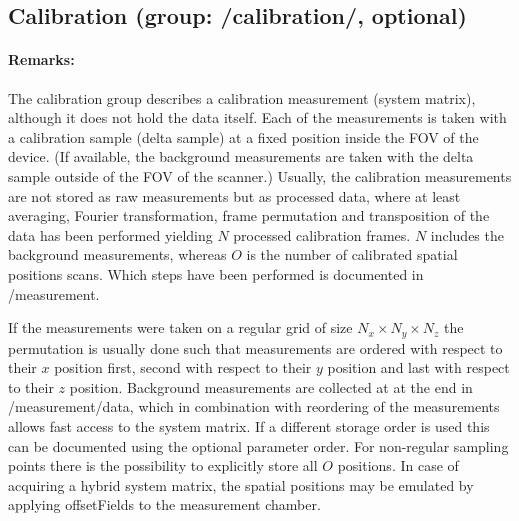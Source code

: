 \documentclass[landscape,a4paper]{article} %
\newcommand{\inlvar}[1]{{\ttfamily#1}}
\begin{document}
\subsection{Calibration (group: \inlvar{/calibration/}, optional)}

\begin{multicols}{2}
\paragraph{Remarks:}
The calibration group describes a calibration measurement (system matrix), although it does not hold the data itself. Each of the measurements is taken with a calibration sample (delta sample) at a fixed position inside the FOV of the device. (If available, the background measurements are taken with the delta sample outside of the FOV of the scanner.) Usually, the calibration measurements are not stored as raw measurements but as processed data, where at least averaging, Fourier transformation, frame permutation and transposition of the data has been performed yielding $N$ processed calibration frames. $N$ includes the background measurements, whereas $O$ is the number of calibrated spatial positions scans. Which steps have been performed is documented in \inlvar{/measurement}.

If the measurements were taken on a regular grid of size $N_x \times N_y \times N_z$ the permutation is usually done such that measurements are ordered with respect to their $x$ position first, second with respect to their $y$ position and last with respect to their $z$ position. Background measurements are collected at at the end in \inlvar{/measurement/data}, which in combination with reordering of the measurements allows fast access to the system matrix. If a different storage order is used this can be documented using the optional parameter \inlvar{order}. For non-regular sampling points there is the possibility to explicitly store all $O$ positions. In case of acquiring a hybrid system matrix, the spatial positions may be emulated by applying \inlvar{offsetFields} to the measurement chamber.
\end{multicols}
\end{document}

